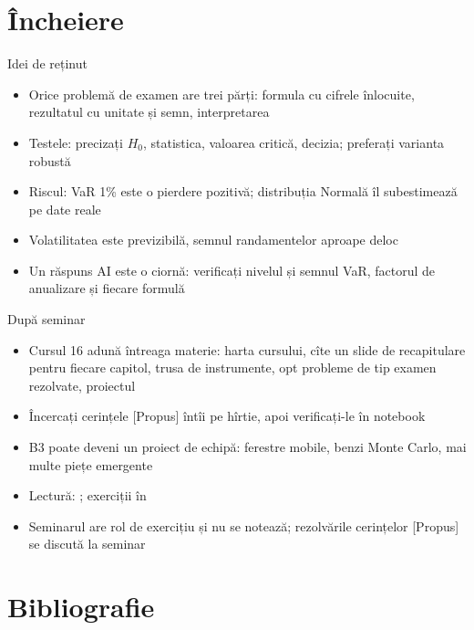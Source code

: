 \section{Încheiere}

\begin{frame}{Idei de reținut}
\itemsize{\small}
\begin{itemize}
    \item Orice problemă de examen are trei părți: formula cu cifrele înlocuite, rezultatul cu unitate și semn, interpretarea
    \item Testele: precizați $H_0$, statistica, valoarea critică, decizia; preferați varianta robustă
    \item Riscul: VaR 1\% este o pierdere pozitivă; distribuția Normală îl subestimează pe date reale
    \item Volatilitatea este previzibilă, semnul randamentelor aproape deloc
    \item Un răspuns AI este o ciornă: verificați nivelul și semnul VaR, factorul de anualizare și fiecare formulă
\end{itemize}
\end{frame}

\begin{frame}{După seminar}
\itemsize{\small}
\begin{itemize}
    \item Cursul 16 adună întreaga materie: harta cursului, cîte un slide de recapitulare pentru fiecare capitol, trusa de instrumente, opt probleme de tip examen rezolvate, proiectul
    \item Încercați cerințele [Propus] întîi pe hîrtie, apoi verificați-le în notebook
    \item B3 poate deveni un proiect de echipă: ferestre mobile, benzi Monte Carlo, mai multe piețe emergente
    \item Lectură: ; exerciții în 
    \item Seminarul are rol de exercițiu și nu se notează; rezolvările cerințelor [Propus] se discută la seminar
\end{itemize}
\end{frame}


\section{Bibliografie}


